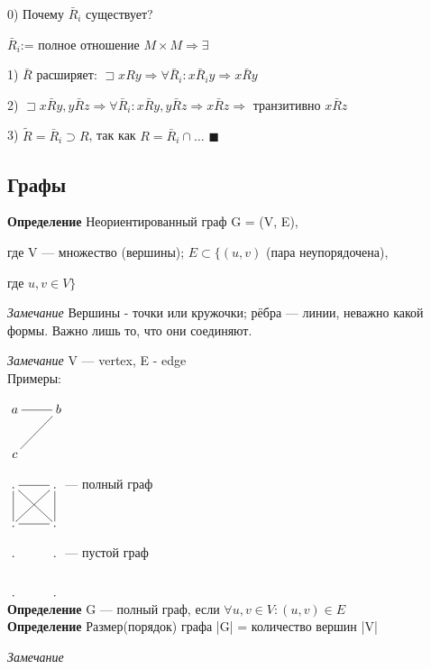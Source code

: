 \documentclass[a4paper, 12pt] {article}
\begin{document}
	0) Почему $\bar R_{i}$ существует?
	
	$\bar R_{i}$:= полное отношение $M \times M \Rightarrow \exists$
	
	1) $\bar R$ расширяет: $\sqsupset xRy \Rightarrow \forall \bar R_{i}: x \bar R_{i} y \Rightarrow x \bar R y$
	
	2)  $\sqsupset x \bar R y, y \bar R z \Rightarrow \forall \bar R_{i}:x \bar R y, y \bar R z \Rightarrow x \bar R z \Rightarrow$ транзитивно $x \bar R z$
	
	3) $\widetilde{R} = \bar R_{i} \supset R$, так как $R=\bar R_{i} \cap \dots $	$\blacksquare$ 
	
	\newpage
	
	\begin{center}
		\section{Графы}
	\end{center}

\textbf{Определение}
Неориентированный граф G = (V, E),

где V --- множество (вершины); $E \subset \{(u, v)$ (пара неупорядочена), 

где  $u, v\in V\}$

\textit{Замечание}
Вершины - точки или кружочки; рёбра --- линии, неважно какой формы. Важно лишь то, что они соединяют.

\textit{Замечание}
V --- vertex, E - edge\\

Примеры:

$\xymatrix{
	a \ar@{-}[r] & b \ar@{-}[ld]\\
	c \\
}$

$\xymatrix{
	. \ar@{-}[r] \ar@{-}[rd] & . \ar@{-}[d] \ar@{-}[ld]\\
	. \ar@{-}[u] \ar@{-}[r]  & . \\ 
}$
--- полный граф

$\xymatrix{
	.  & . \\
	.   & . \\ 
}$
--- пустой граф\\


\textbf{Определение}
G --- полный граф, если $\forall u, v \in V: (u, v) \in E$\\

	
\textbf{Определение}
Размер(порядок) графа |G| = количество вершин |V|

\textit{Замечание}
\end{document}
